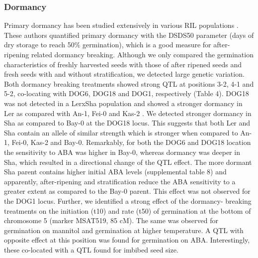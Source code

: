 \subsubsection{Dormancy}
Primary dormancy has been studied extensively in various RIL populations \cite{Bentsink:2010}. These 
authors quantified primary dormancy with the DSDS50 parameter (days of dry storage to reach 50\% 
germination), which is a good measure for after-ripening related dormancy breaking. Although we only 
compared the germination characteristics of freshly harvested seeds with those of after ripened 
seeds and fresh seeds with and without stratification, we detected large genetic variation. Both 
dormancy breaking treatments showed strong QTL at positions 3-2, 4-1 and 5-2, co-locating with DOG6, 
DOG18 and DOG1, respectively (Table 4). DOG18 was not detected in a LerxSha population and showed a 
stronger dormancy in Ler as compared with An-1, Fei-0 and Kas-2 \cite{Bentsink:2010}. We detected stronger 
dormancy in Sha as compared to Bay-0 at the DOG18 locus. This suggests that both Ler and Sha contain 
an allele of similar strength which is stronger when compared to An-1, Fei-0,  Kas-2 and Bay-0. Remarkably, 
for both the DOG6 and DOG18 location the sensitivity to ABA was higher in Bay-0, whereas dormancy was 
deeper in Sha, which resulted in a directional change of the QTL effect. The more dormant Sha parent 
contains higher initial ABA levels (supplemental table 8) and apparently, after-ripening and 
stratification reduce the ABA sensitivity to a greater extent as compared to the Bay-0 parent. This 
effect was not observed for the DOG1 locus. Further, we identified a strong effect of the dormancy-
breaking treatments on the initiation (t10) and rate (t50) of germination at the bottom of chromosome 5 
(marker MSAT519, 85 cM). The same was observed for germination on mannitol and germination at higher 
temperature. A QTL with opposite effect at this position was found for germination on ABA. Interestingly, 
these co-located with a QTL found for imbibed seed size. 

